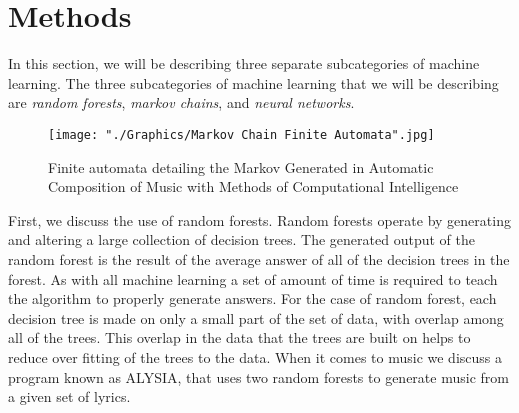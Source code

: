 \documentclass{sig-alternate}
\begin{document}
\section{Methods}
\label{sec:methods}

	In this section, we will be describing three separate subcategories of machine learning. The three subcategories of machine learning that we will be describing are \textit{random forests},\textit{ markov chains}, and \textit{neural networks}.

\begin{figure}[H]
	\texttt{[image: "./Graphics/Markov Chain Finite Automata".jpg]}
	\caption{Finite automata detailing the Markov Generated in Automatic Composition of Music with Methods of Computational Intelligence}
	\label{fig:markovchain1}
\end{figure}
	First, we discuss the use of random forests. Random forests operate by generating and altering a large collection of decision trees. The generated output of the random forest is the result of the average answer of all of the decision trees in the forest. As with all machine learning a set of amount of time is required to teach the algorithm to properly generate answers. For the case of random forest, each decision tree is made on only a small part of the set of data, with overlap among all of the trees. This overlap in the data that the trees are built on helps to reduce over fitting of the trees to the data. When it comes to music we discuss a program known as ALYSIA, that uses two random forests to generate music from a given set of lyrics.
	
\end{document}
